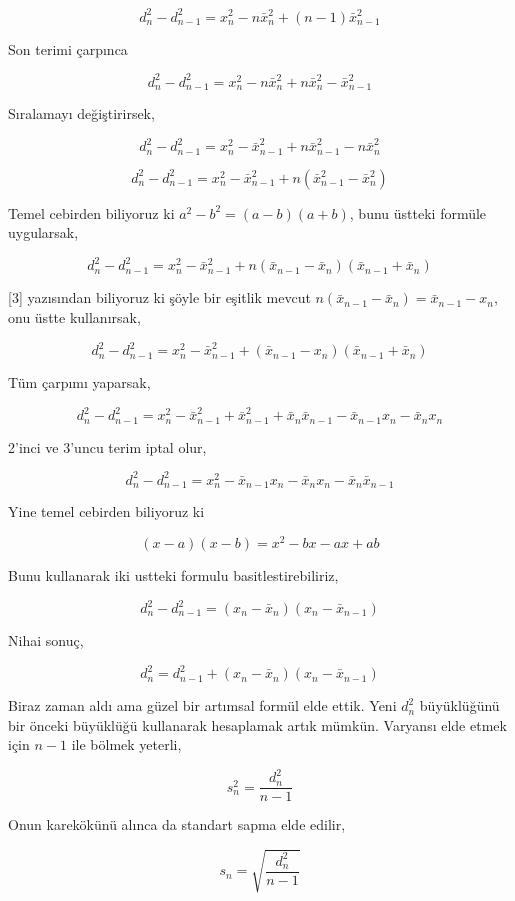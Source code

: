 \documentclass[12pt,fleqn]{article}\usepackage{../../common}
\begin{document}
$$
d_n^2 - d_{n-1}^2 = x_n^2 - n \bar{x}_n^2 + (n-1) \bar{x}_{n-1}^2
$$

Son terimi çarpınca

$$
d_n^2 - d_{n-1}^2 = x_n^2 - n \bar{x}_n^2 + n \bar{x}_n^2 - \bar{x}_{n-1}^2
$$

Sıralamayı değiştirirsek,

$$
d_n^2 - d_{n-1}^2 = x_n^2  - \bar{x}_{n-1}^2 + n \bar{x}_{n-1}^2 - n \bar{x}_n^2
$$

$$
d_n^2 - d_{n-1}^2 = x_n^2  - \bar{x}_{n-1}^2 + n (\bar{x}_{n-1}^2 - \bar{x}_n^2)
$$

Temel cebirden biliyoruz ki $a^2-b^2 = (a-b)(a+b)$, bunu üstteki formüle
uygularsak,

$$
d_n^2 - d_{n-1}^2 =
x_n^2  -
\bar{x}_{n-1}^2 +
n (\bar{x}_{n-1} - \bar{x}_n) (\bar{x}_{n-1} + \bar{x}_n) 
$$

[3] yazısından biliyoruz ki şöyle bir eşitlik mevcut $n (\bar{x}_{n-1} - \bar{x}_n) = \bar{x}_{n-1} - x_n $,
onu üstte kullanırsak,

$$
d_n^2 - d_{n-1}^2 = x_n^2  - \bar{x}_{n-1}^2 +  (\bar{x}_{n-1} - x_n) (\bar{x}_{n-1} + \bar{x}_n) 
$$

Tüm çarpımı yaparsak,

$$
d_n^2 - d_{n-1}^2 =
x_n^2 -
\bar{x}_{n-1}^2  +
\bar{x}_{n-1}^2 +
\bar{x}_n \bar{x}_{n-1} -
\bar{x}_{n-1} x_n -
\bar{x}_n x_n
$$

2'inci ve 3'uncu terim iptal olur,

$$
d_n^2 - d_{n-1}^2 =
x_n^2 -
\bar{x}_{n-1} x_n -
\bar{x}_n x_n -
\bar{x}_n \bar{x}_{n-1}
$$

Yine temel cebirden biliyoruz ki

$$
(x-a)(x-b) = x^2 - bx - ax + ab
$$

Bunu kullanarak iki ustteki formulu basitlestirebiliriz,

$$
d_n^2 - d_{n-1}^2 = (x_n - \bar{x}_n)(x_n - \bar{x}_{n-1} )
$$

Nihai sonuç,

$$
d_n^2 = d_{n-1}^2 + (x_n - \bar{x}_n)(x_n - \bar{x}_{n-1} )
$$

Biraz zaman aldı ama güzel bir artımsal formül elde ettik. Yeni $d_n^2$
büyüklüğünü bir önceki büyüklüğü kullanarak hesaplamak artık mümkün. 
Varyansı elde etmek için $n-1$ ile bölmek yeterli,

$$
s_n^2 = \frac{d_n^2}{n-1}
$$

Onun karekökünü alınca da standart sapma elde edilir,

$$
s_n = \sqrt{\frac{d_n^2}{n-1}}
$$
\end{document}
